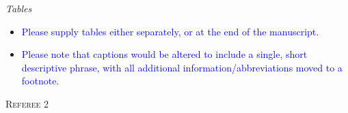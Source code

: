 \documentclass[12pt,letterpaper]{article}
\renewcommand{\section}[1]{%
\bigskip
\begin{center}
\begin{Large}
\normalfont\scshape #1
\medskip
\end{Large}
\end{center}}
\renewcommand{\subsection}[1]{%
\bigskip
\begin{center}
\begin{large}
\normalfont\itshape #1
\end{large}
\end{center}}
\begin{document}
\subsection{Tables}
\begin{itemize}
\item{\textcolor{blue}{Please supply tables either separately, or at the end of the manuscript.}}
\item{\textcolor{blue}{Please note that captions would be altered to include a single, short descriptive phrase, with all additional information/abbreviations moved to a footnote.}}
\end{itemize}















\section{Referee 2}
\end{document}
